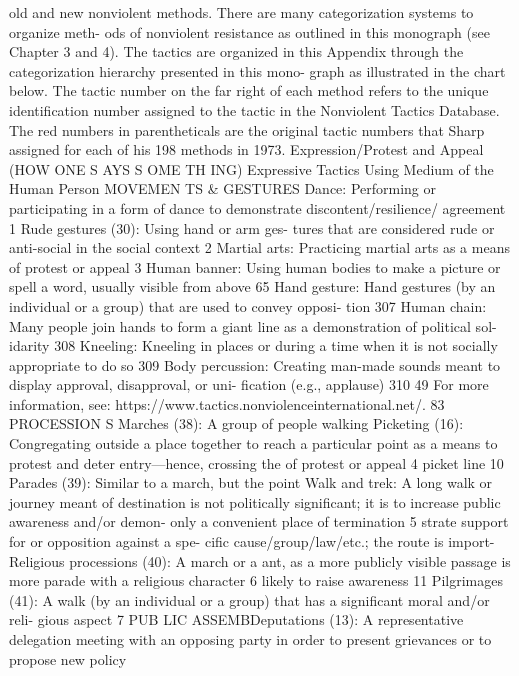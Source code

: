 \documentclass[twoside,a4paper,12pt,fleqn,openany]{extbook}
\begin{document}
old and new nonviolent methods. There are many categorization systems to organize meth-
ods of nonviolent resistance as outlined in this monograph (see Chapter 3 and 4). The tactics
are organized in this Appendix through the categorization hierarchy presented in this mono-
graph as illustrated in the chart below.
The tactic number on the far right of each method refers to the unique identification
number assigned to the tactic in the Nonviolent Tactics Database.
The red numbers in parentheticals are the original tactic numbers that Sharp assigned
for each of his 198 methods in 1973.
Expression/Protest and Appeal
(HOW ONE S AYS S OME TH ING)
Expressive Tactics Using Medium of the Human Person
MOVEMEN TS & GESTURES
Dance: Performing or participating in a form of
dance to demonstrate discontent/resilience/
agreement
 1
Rude gestures (30): Using hand or arm ges-
tures that are considered rude or anti-social in
the social context
 2
Martial arts: Practicing martial arts as a means
of protest or appeal
 3
Human banner: Using human bodies to make
a picture or spell a word, usually visible from
above
 65
Hand gesture: Hand gestures (by an individual
or a group) that are used to convey opposi-
tion
 307
Human chain: Many people join hands to form
a giant line as a demonstration of political sol-
idarity
 308
Kneeling: Kneeling in places or during a time
when it is not socially appropriate to do so		
309
Body percussion: Creating man-made sounds
meant to display approval, disapproval, or uni-
fication (e.g., applause)
 310
49
 For more information, see: https://www.tactics.nonviolenceinternational.net/.
83
PROCESSION S
Marches (38): A group of people walking
 Picketing (16): Congregating outside a place
together to reach a particular point as a means
 to protest and deter entry—hence, crossing the
of protest or appeal
 4
 picket line
 10
Parades (39): Similar to a march, but the point
 Walk and trek: A long walk or journey meant
of destination is not politically significant; it is
 to increase public awareness and/or demon-
only a convenient place of termination
 5
 strate support for or opposition against a spe-
cific cause/group/law/etc.; the route is import-
Religious processions (40): A march or a
 ant, as a more publicly visible passage is more
parade with a religious character
 6
 likely to raise awareness
 11
Pilgrimages (41): A walk (by an individual or a
group) that has a significant moral and/or reli-
gious aspect
 7
PUB LIC ASSEMBDeputations (13): A representative delegation
meeting with an opposing party in order to
present grievances or to propose new policy		
\end{document}
